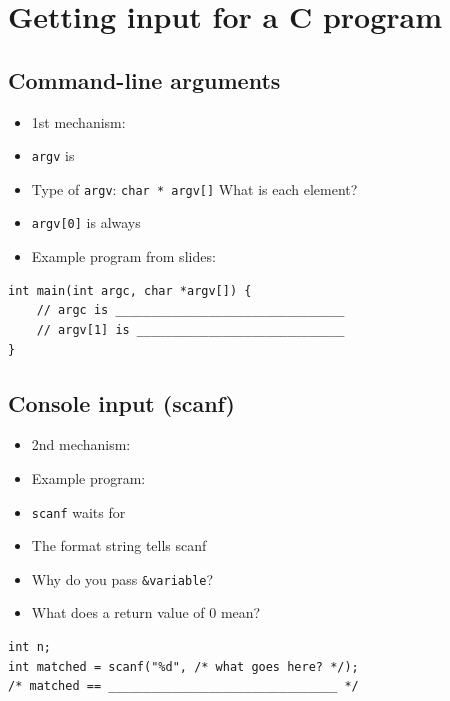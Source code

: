 \documentclass[12pt]{article}
\begin{document}
\vspace{1.2em}

\section{Getting input for a C program}

\subsection{Command-line arguments}
\begin{itemize}[leftmargin=*]
  \item 1st mechanism: \hrulefill
  \item \texttt{argv} is \hrulefill
  \item Type of \texttt{argv}: \texttt{char * argv[]} \quad What is each element? \hrulefill
  \item \texttt{argv[0]} is always \hrulefill
  \item Example program from slides: \hrulefill
\end{itemize}

\begin{lstlisting}
int main(int argc, char *argv[]) {
    // argc is ________________________________
    // argv[1] is _____________________________
}
\end{lstlisting}

\subsection{Console input (scanf)}
\begin{itemize}[leftmargin=*]
  \item 2nd mechanism: \hrulefill
  \item Example program: \hrulefill
  \item \texttt{scanf} waits for \hrulefill
  \item The format string tells scanf \hrulefill
  \item Why do you pass \texttt{\&variable}? \hrulefill
  \item What does a return value of 0 mean? \hrulefill
\end{itemize}

\begin{lstlisting}
int n;
int matched = scanf("%d", /* what goes here? */);
/* matched == ________________________________ */
\end{lstlisting}

\vspace{1.2em}
\end{document}
